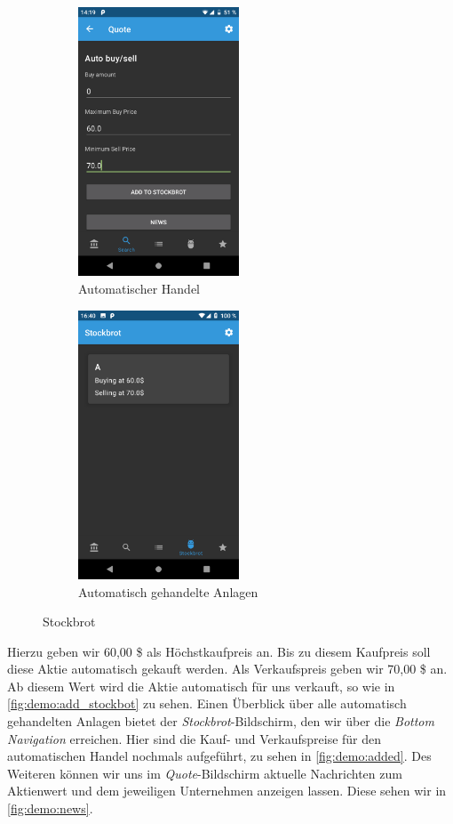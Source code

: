 \documentclass[a4paper]{article}
\begin{document}
\begin{figure}[H]
	\begin{subfigure}{.5\textwidth}
		\centering
		\includegraphics[height=8cm,keepaspectratio]{./images/demo/add_stockbot.png}
		\caption{Automatischer Handel}
		\label{fig:demo:add_stockbot}
	\end{subfigure}
	\begin{subfigure}{.5\textwidth}
		\centering
		\includegraphics[height=8cm,keepaspectratio]{./images/demo/added_stockbot_view.png}
		\caption{Automatisch gehandelte Anlagen}
		\label{fig:demo:added}
	\end{subfigure}
	\caption{Stockbrot}
	\label{fig:demo:bot}
\end{figure}

Hierzu geben wir 60,00 \$ als Höchstkaufpreis an.
Bis zu diesem Kaufpreis soll diese Aktie automatisch gekauft werden.
Als Verkaufspreis geben wir 70,00 \$ an.
Ab diesem Wert wird die Aktie automatisch für uns verkauft, so wie in \autoref{fig:demo:add_stockbot} zu sehen.
Einen Überblick über alle automatisch gehandelten Anlagen bietet der \textit{Stockbrot}-Bildschirm, den wir über die \textit{Bottom Navigation} erreichen.
Hier sind die Kauf- und Verkaufspreise für den automatischen Handel nochmals aufgeführt, zu sehen in  \autoref{fig:demo:added}.\newline
Des Weiteren können wir uns im \textit{Quote}-Bildschirm aktuelle Nachrichten zum Aktienwert und dem jeweiligen Unternehmen anzeigen lassen.
Diese sehen wir in \autoref{fig:demo:news}.
\end{document}
